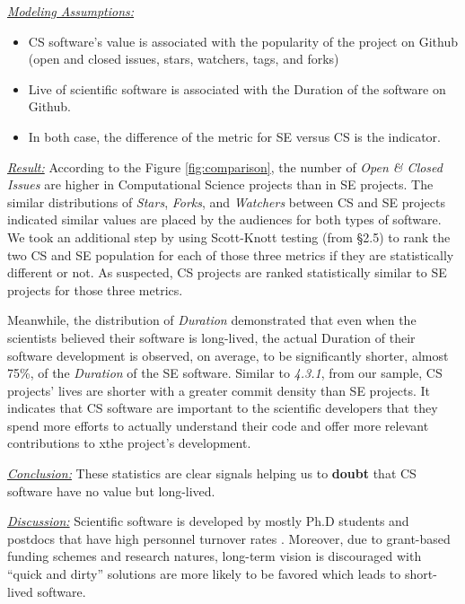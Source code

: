 \documentclass[sigconf,review,anonymous]{acmart}
\newcommand{\bi}{\begin{itemize}}
\newcommand{\ei}{\end{itemize}}
\newenvironment{RQ}{\vspace{1mm}\begin{tcolorbox}[enhanced,width=3.4in,size=fbox,colback=red!5!white,drop shadow southwest,sharp corners]}{\end{tcolorbox}}
\begin{document}
\noindent \textit{\underline{Modeling Assumptions:}} 
\bi
\item CS software's value is associated with the popularity of the project on Github (open and closed issues, stars, watchers, tags, and forks)
\item Live of scientific software is associated with the Duration of the software on Github. 
\item In both case, the difference of the metric for SE versus CS is the indicator. 
\ei


\noindent \textit{\underline{Result:}} According to the Figure \ref{fig:comparison}, the number of \textit{Open \& Closed Issues} are higher in Computational Science projects than in SE projects. The similar distributions of \textit{Stars}, \textit{Forks}, and \textit{Watchers} between CS and SE projects indicated similar values are placed by the audiences for both types of software. We took an additional step by using Scott-Knott testing (from \S2.5)  to rank the two CS and SE population for each of those three metrics if they are statistically different or not. As suspected, CS projects are ranked statistically similar to SE projects for those three metrics. 

Meanwhile, the distribution of \textit{Duration} demonstrated that even when the scientists believed their software is long-lived, the actual Duration of their software development is observed, on average, to be significantly shorter, almost 75\%, of the \textit{Duration} of the SE software. Similar to \textit{4.3.1}, from our sample, CS projects' lives are shorter with a greater commit density than SE projects. It indicates that CS software are important to the scientific developers that they spend more efforts to actually understand their code and offer more relevant contributions to xthe project's development.   


\begin{RQ}
\textit{\underline{Conclusion:}} These statistics are clear signals helping us to \textbf{doubt} that CS software have no value but long-lived.  
\end{RQ}

\noindent \textit{\underline{Discussion:}} Scientific software is developed by mostly Ph.D students and postdocs that have high personnel turnover rates \cite{johan18_secs}. Moreover, due to grant-based funding schemes and research natures, long-term vision is discouraged with ``quick and dirty'' solutions are more likely to be favored \cite{boyle09_lessons} which leads to short-lived software. 
\end{document}

